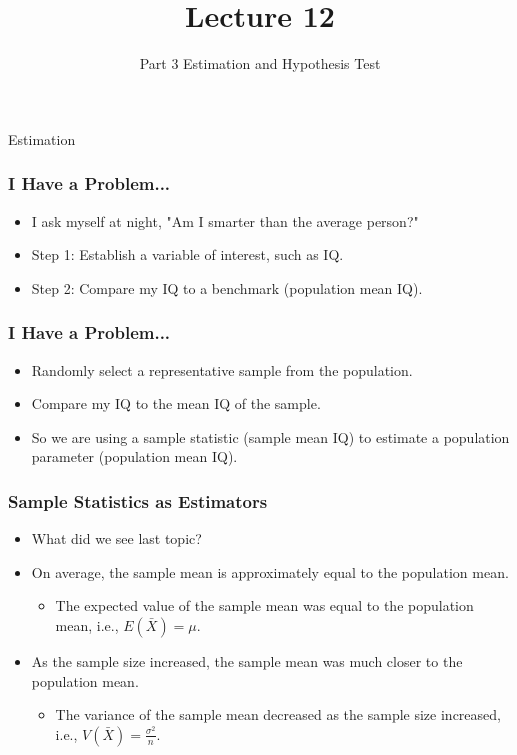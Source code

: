 \documentclass[12pt]{beamer}
\title[ECON2843]{Lecture 12}
\subtitle{Part 3 Estimation and Hypothesis Test}
\date{}
\begin{document}
	\begin{frame}
		\titlepage
	\end{frame}
	\begin{frame}
		\vspace{1cm}
		\centering
		{\color{blue}\large Estimation}
	\end{frame}
	\begin{frame}
		\frametitle{I Have a Problem...}
		
		\begin{itemize}[label={\color{blue}$\blacktriangleright$}]
			\item I ask myself at night, "Am I smarter than the average person?"
			\vspace{1cm}
			\item Step 1: Establish a variable of interest, such as IQ.
			\vspace{1cm}
			\item Step 2: Compare my IQ to a benchmark (population mean IQ).
		\end{itemize}
		
	\end{frame}
	\begin{frame}
		\frametitle{I Have a Problem...}
		
		\begin{itemize}[label={\color{blue}$\blacktriangleright$}]
			\item Randomly select a representative sample from the population.
			\vspace{1cm}
			\item Compare my IQ to the mean IQ of the sample.
			\vspace{1cm}
			\item So we are using a sample statistic (sample mean IQ) to estimate a population parameter (population mean IQ).
		\end{itemize}
		
	\end{frame}
\begin{frame}
	\frametitle{Sample Statistics as Estimators}
	
	\begin{itemize}[label={\color{blue}$\blacktriangleright$}]
		\item What did we see last topic?
		\item On average, the sample mean is approximately equal to the population mean.
		\begin{itemize}[label={\color{blue}$\blacktriangleright$}]
			\item The expected value of the sample mean was equal to the population mean, i.e., $E(\bar{X}) = \mu$.
		\end{itemize}
		\item As the sample size increased, the sample mean was much closer to the population mean.
		\begin{itemize}[label={\color{blue}$\blacktriangleright$}]
			\item The variance of the sample mean decreased as the sample size increased, i.e., $V(\bar{X}) = \frac{\sigma^2}{n}$.
		\end{itemize}
	\end{itemize}
	
\end{frame}
\end{document}

